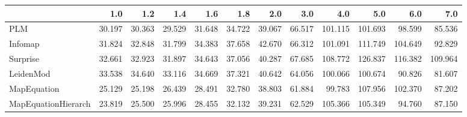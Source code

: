 \begin{tabular}{lrrrrrrrrrrr}
\toprule
{} &    1.0 &    1.2 &    1.4 &    1.6 &    1.8 &    2.0 &    3.0 &     4.0 &     5.0 &     6.0 &     7.0 \\
\midrule
PLM                 & 30.197 & 30.363 & 29.529 & 31.648 & 34.722 & 39.067 & 66.517 & 101.115 & 101.693 &  98.599 &  85.536 \\
Infomap             & 31.824 & 32.848 & 31.799 & 34.383 & 37.658 & 42.670 & 66.312 & 101.091 & 111.749 & 104.649 &  92.829 \\
Surprise            & 32.661 & 32.923 & 31.897 & 34.643 & 37.056 & 40.287 & 67.685 & 108.772 & 126.837 & 116.382 & 109.964 \\
LeidenMod           & 33.538 & 34.640 & 33.116 & 34.669 & 37.321 & 40.642 & 64.056 & 100.066 & 100.674 &  90.826 &  81.607 \\
MapEquation         & 25.129 & 25.198 & 26.439 & 28.491 & 32.780 & 38.803 & 61.884 &  99.783 & 107.956 & 102.370 &  87.202 \\
MapEquationHierarch & 23.819 & 25.500 & 25.996 & 28.455 & 32.132 & 39.231 & 62.529 & 105.366 & 105.349 &  94.760 &  87.150 \\
\bottomrule
\end{tabular}
